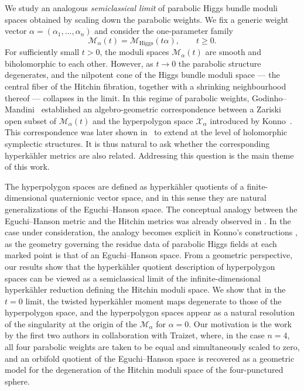 \documentclass[12pt,a4paper]{amsart}
\theoremstyle{definition}
\theoremstyle{remark}
\newcommand{\Mcal}{\mathcal M}
\begin{document}
We study an analogous \emph{semiclassical limit} of
parabolic Higgs bundle moduli spaces obtained by scaling down the parabolic weights.
We fix a generic weight vector $\alpha=(\alpha_1,\dots,\alpha_n)$
and consider the one-parameter family
\[
\Mcal_\alpha(t)=\Mcal_{\mathrm{Higgs}}(t\alpha), \qquad t\ge 0.
\]
For sufficiently small $t>0$, the moduli spaces $\Mcal_\alpha(t)$ are smooth and
biholomorphic to each other. However, as $t\to0$ the parabolic structure degenerates, and the nilpotent cone of the
Higgs bundle moduli space --- the central fiber of the Hitchin fibration, together
with a shrinking neighbourhood thereof --- collapses in the limit. 
In this regime of parabolic weights, Godinho--Mandini~\cite{GoMa} established an algebro-geometric correspondence between a Zariski open subset of $\Mcal_\alpha(t)$  and the hyperpolygon space 
$\mathcal X_\alpha$ introduced by Konno~\cite{Konno2}. This correspondence was later shown in~\cite{BiFloGoMa} to extend at the level of holomorphic symplectic structures.
It is thus natural to ask whether the 
corresponding hyperk\"ahler metrics are also related. 
Addressing this question is the main theme of this work.



The hyperpolygon spaces are defined as hyperk\"ahler 
quotients of a finite-dimensional quaternionic vector space, and in this sense they are natural generalizations of the Eguchi--Hanson space.  
The conceptual analogy between the 
Eguchi--Hanson metric and the Hitchin metrics was already observed in \cite{Hitchin91}.
In the case under consideration,
the analogy becomes explicit in Konno's constructions
 \cite{Konno, Konno2}, as
 the geometry governing the residue data of parabolic Higgs fields at each marked point is that of 
 an Eguchi--Hanson space. 
From a geometric perspective, our results show that the hyperk\"ahler quotient description 
of hyperpolygon spaces can be viewed as a semiclassical limit of the infinite-dimensional 
hyperk\"ahler reduction defining the Hitchin moduli space. We show that in the $t=0$ limit, 
the twisted hyperk\"ahler moment maps degenerate to  those of the hyperpolygon space, and the 
hyperpolygon spaces appear as a natural resolution of the singularity at the origin of the
$\Mcal_\alpha$ for $\alpha=0.$
Our motivation is the work \cite{HellerHellerTraizet2025} by the first two authors in 
collaboration with Traizet, 
 where, in the case $n=4$, all four parabolic weights are taken to be equal and simultaneously scaled to zero, and an orbifold quotient of the Eguchi--Hanson space is recovered as a geometric model for the degeneration of the Hitchin moduli space of the four-punctured sphere.
\end{document}
